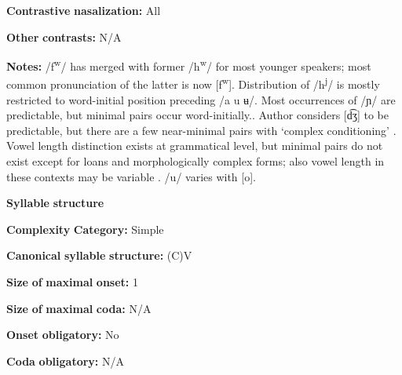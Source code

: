 \documentclass[output=paper]{langsci/langscibook}
\begin{document}
\begin{styleBody}
\textbf{Contrastive} \textbf{nasalization:} All
\end{styleBody}

\begin{styleBody}
\textbf{Other} \textbf{contrasts:} N/A
\end{styleBody}

\begin{styleBody}
\textbf{Notes:} /f\textsuperscript{w}/ has merged with former /h\textsuperscript{w}/ for most younger speakers; most common pronunciation of the latter is now [f\textsuperscript{w}]. Distribution of /h\textsuperscript{j}/ is mostly restricted to word-initial position preceding /a u ʉ/. Most occurrences of /ɲ/ are predictable, but minimal pairs occur word-initially.. Author considers [d͡ʒ] to be predictable, but there are a few near-minimal pairs with ‘complex conditioning’ \citep[30-49]{Olawsky2006}. Vowel length distinction exists at grammatical level, but minimal pairs do not exist except for loans and morphologically complex forms; also vowel length in these contexts may be variable \citep[56-7]{Olawsky2006}. /u/ varies with [o].
\end{styleBody}

\begin{styleBody}
\textbf{Syllable} \textbf{structure}
\end{styleBody}

\begin{styleBody}
\textbf{Complexity} \textbf{Category:} Simple
\end{styleBody}

\begin{styleBody}
\textbf{Canonical} \textbf{syllable} \textbf{structure:} (C)V \citep[75-6]{Olawsky2006}
\end{styleBody}

\begin{styleBody}
\textbf{Size} \textbf{of} \textbf{maximal} \textbf{onset:} 1
\end{styleBody}

\begin{styleBody}
\textbf{Size} \textbf{of} \textbf{maximal} \textbf{coda:} N/A
\end{styleBody}

\begin{styleBody}
\textbf{Onset} \textbf{obligatory:} No
\end{styleBody}

\begin{styleBody}
\textbf{Coda} \textbf{obligatory:} N/A
\end{styleBody}
\end{document}
